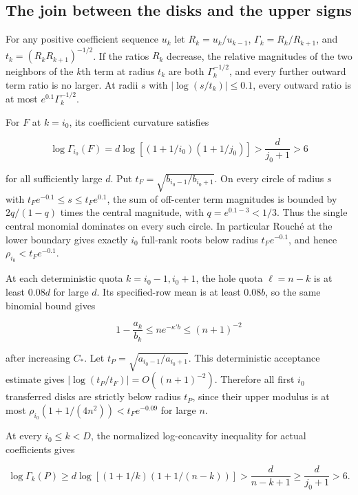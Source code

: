 \subsection{The join between the disks and the upper signs}

For any positive coefficient sequence $u_k$ let $R_k=u_k/u_{k-1}$, $\Gamma_k=R_k/R_{k+1}$, and $t_k=(R_kR_{k+1})^{-1/2}$. If the ratios $R_k$ decrease, the relative magnitudes of the two neighbors of the $k$th term at radius $t_k$ are both $\Gamma_k^{-1/2}$, and every further outward term ratio is no larger. At radii $s$ with $|\log(s/t_k)|\le0.1$, every outward ratio is at most $e^{0.1}\Gamma_k^{-1/2}$.

For $F$ at $k=i_0$, its coefficient curvature satisfies

\begin{equation*}
\log \Gamma_{i_0}(F)
=d\log[(1+1/i_0)(1+1/j_0)]
> \frac{d}{j_0+1}>6
\end{equation*}

for all sufficiently large $d$. Put $t_F=\sqrt{b_{i_0-1}/b_{i_0+1}}$. On every circle of radius $s$ with $t_F e^{-0.1}\le s\le t_F e^{0.1}$, the sum of off-center term magnitudes is bounded by $2q/(1-q)$ times the central magnitude, with $q=e^{0.1-3}<1/3$. Thus the single central monomial dominates on every such circle. In particular Rouché at the lower boundary gives exactly $i_0$ full-rank roots below radius $t_F e^{-0.1}$, and hence $\rho_{i_0}<t_F e^{-0.1}$.

At each deterministic quota $k=i_0-1,i_0+1$, the hole quota $\ell=n-k$ is at least $0.08d$ for large $d$. Its specified-row mean is at least $0.08b$, so the same binomial bound gives

\begin{equation*}
1-\frac{a_k}{b_k}\le n e^{-\kappa' b}\le(n+1)^{-2}
\end{equation*}

after increasing $C_*$. Let $t_P=\sqrt{a_{i_0-1}/a_{i_0+1}}$. This deterministic acceptance estimate gives $|\log(t_P/t_F)|=O((n+1)^{-2})$. Therefore all first $i_0$ transferred disks are strictly below radius $t_P$, since their upper modulus is at most $\rho_{i_0}(1+1/(4n^2))<t_F e^{-0.09}$ for large $n$.

At every $i_0\le k<D$, the normalized log-concavity inequality for actual coefficients gives

\begin{equation*}
\log\Gamma_k(P)\ge d\log[(1+1/k)(1+1/(n-k))]
>\frac{d}{n-k+1}\ge\frac{d}{j_0+1}>6 .
\end{equation*}

